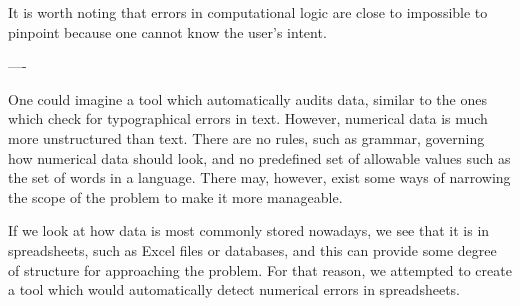 It is worth noting that errors in computational logic are close to
impossible to pinpoint because one cannot know the user's intent.


----

One could imagine a tool which automatically audits data, similar to
the ones which check for typographical errors in text.  However,
numerical data is much more unstructured than text.  There are no
rules, such as grammar, governing how numerical data should look, and
no predefined set of allowable values such as the set of words in a
language.  There may, however, exist some ways of narrowing the scope
of the problem to make it more manageable.

If we look at how data is most commonly stored nowadays, we see that
it is in spreadsheets, such as Excel files or databases, and this can
provide some degree of structure for approaching the problem.  For
that reason, we attempted to create a tool which would automatically
detect numerical errors in spreadsheets.  

